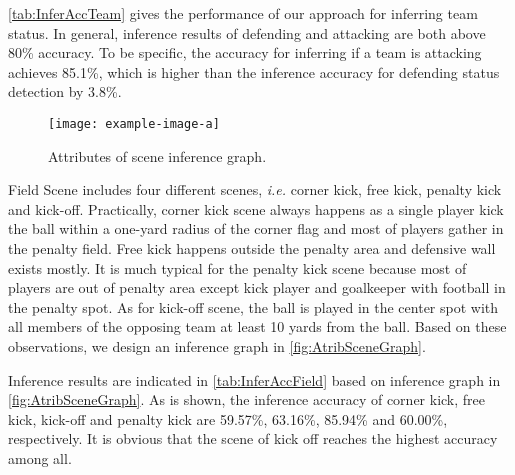 \autoref{tab:InferAccTeam} gives the performance of our approach for inferring team status. 
In general, inference results of defending and attacking are both above 80\% accuracy.
To be specific, the accuracy for inferring if a team is attacking achieves 85.1\%, which is higher than the inference accuracy for defending status detection by 3.8\%.



\begin{figure}[!bth]
	\centering	
	\begin{minipage}[b]{\linewidth}
		\centerline{\texttt{[image: example-image-a]}}
	\end{minipage}\hfill
	\caption{Attributes of scene inference graph.}
	\label{fig:AtribSceneGraph}
\end{figure}

Field Scene includes four different scenes, \textit{i.e.} corner kick, free kick, penalty kick and kick-off. Practically, corner kick scene always happens as a single player kick the ball within a one-yard radius of the corner flag and most of players gather in the penalty field. Free kick happens outside the penalty area and defensive wall exists mostly. It is much typical for the penalty kick scene because most of players are out of penalty area except kick player and goalkeeper with football in the penalty spot. As for kick-off scene, the ball is played in the center spot with all members of the opposing team at least 10 yards from the ball. Based on these observations, we design an inference graph in \autoref{fig:AtribSceneGraph}.


Inference results are indicated in \autoref{tab:InferAccField} based on inference graph in \autoref{fig:AtribSceneGraph}. As is shown, the inference accuracy of corner kick, free kick, kick-off and penalty kick are 59.57\%, 63.16\%, 85.94\% and 60.00\%, respectively. It is obvious that the scene of kick off reaches the highest accuracy among all.
 

